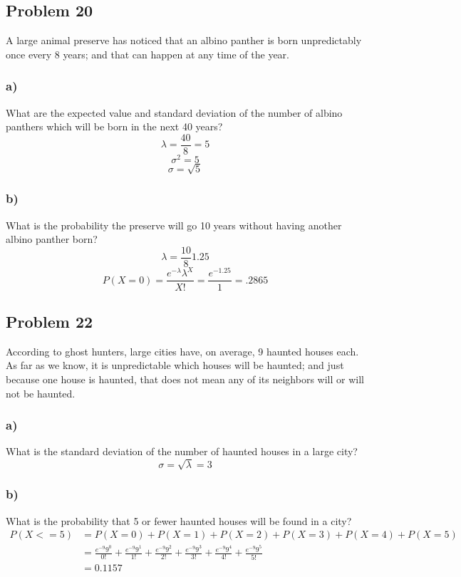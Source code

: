 \documentclass{article}
\begin{document}
\subsection*{Problem 20}
A large animal preserve has noticed that an albino panther is born unpredictably once every 8 years; and that can happen at any time of the year.
\subsubsection*{a)}
What are the expected value and standard deviation of the number of albino panthers which will be born in the next 40 years?
\begin{equation}
    \lambda = \frac{40}{8} =  5
\end{equation}
\begin{equation}
    \sigma^2 = 5
\end{equation}
\begin{equation}
    \sigma = \sqrt{5}
\end{equation}
\subsubsection*{b)}
What is the probability the preserve will go 10 years without having another albino panther born?\
\begin{equation}
    \lambda = \frac{10}{8}  \boxed{1.25}
\end{equation}
\begin{equation}
    P(X=0) = \frac{e^{-\lambda}\lambda^X}{X!} = \frac{e^{-1.25}}{1} = \boxed{.2865}
\end{equation}
\subsection*{Problem 22}
According to ghost hunters, large cities have, on average, 9 haunted houses each. As far as we know, it is unpredictable which houses will be haunted; and just because one house is haunted, that does not mean any of its neighbors will or will not be haunted.
\subsubsection*{a)}
What is the standard deviation of the number of haunted houses in a large city?
\begin{equation}
    \sigma = \sqrt{\lambda} = \boxed{3}
\end{equation}
\subsubsection*{b)}
What is the probability that 5 or fewer haunted houses will be found in a city?
\begin{align}
    P(X<=5)&=P(X=0)+P(X=1)+P(X=2)+P(X=3)+P(X=4)+P(X=5)\\
    &=\frac{e^{-9}9^0}{0!}+ \frac{e^{-9}9^1}{1!}+\frac{e^{-9}9^2}{2!}+\frac{e^{-9}9^3}{3!}+\frac{e^{-9}9^4}{4!}+\frac{e^{-9}9^5}{5!}\\
    &=0.1157
\end{align}
\end{document}
